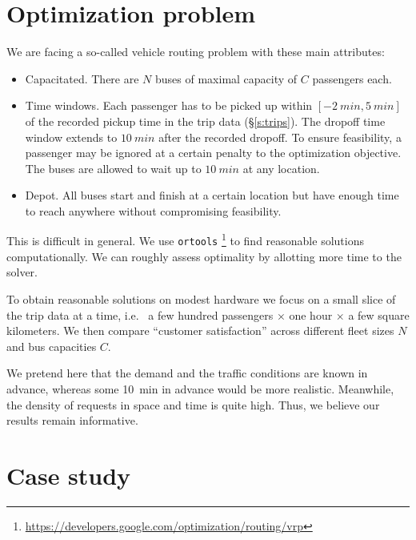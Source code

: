 \documentclass[12pt,notitlepage]{article}
\begin{document}
\section{Optimization problem}

We are facing
a so-called vehicle routing problem with these main attributes:
%
\begin{itemize}
\item
	Capacitated.
	There are $N$ buses of maximal capacity of $C$ passengers each.
\item
	Time windows.
	Each passenger has to be picked up
	within $[-\SI{2}{min}, \SI{5}{min}]$
	of
	the recorded pickup time in the trip data (\S\ref{s:trips}).
	The dropoff time window extends to $\SI{10}{min}$
	after the recorded dropoff.
	To ensure feasibility,
	a passenger may be ignored 
	at a certain penalty to the optimization objective.	
	The buses are allowed to wait up to $\SI{10}{min}$
	at any location.
\item
	Depot.
	All buses start and finish at a certain location
	but have enough time to reach anywhere
	without compromising feasibility.
\end{itemize}

%

This is difficult in general.
%
We use \texttt{ortools}%
\footnote{\href{https://developers.google.com/optimization/routing/vrp}{https://developers.google.com/optimization/routing/vrp}}
to find reasonable solutions computationally.
%
We can roughly assess optimality
by allotting more time to the solver.
%


%

To obtain reasonable solutions
on modest hardware
we focus on a small slice of 
the trip data at a time,
i.e.~%
a few hundred passengers $\times$ one hour $\times$ a few square kilometers.
%
We then compare ``customer satisfaction''
across different fleet sizes $N$ and bus capacities $C$.

%

We pretend here that the demand
and the traffic conditions
are known in advance,
whereas some \SI{10}{min} in advance
would be more realistic.
%
Meanwhile, the density of requests in space and time is quite high.
%
Thus, we believe our results remain informative.


\section{Case study} \label{s:case}
\end{document}
